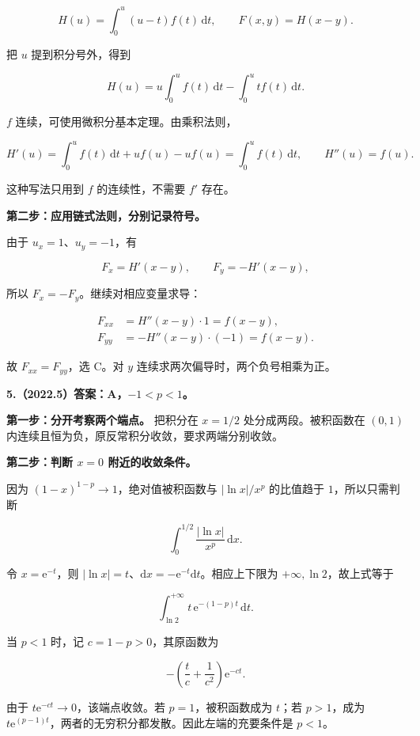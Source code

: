 \documentclass[UTF8,11pt,fontset=windows]{ctexart}
\begin{document}
$$
H(u)=\int_0^u(u-t)f(t)\,\mathrm dt,
\qquad F(x,y)=H(x-y).
$$

把 $u$ 提到积分号外，得到

$$
H(u)=u\int_0^u f(t)\,\mathrm dt-\int_0^u t f(t)\,\mathrm dt.
$$

$f$ 连续，可使用微积分基本定理。由乘积法则，

$$
H'(u)=\int_0^u f(t)\,\mathrm dt+uf(u)-uf(u)
=\int_0^u f(t)\,\mathrm dt,
\qquad H''(u)=f(u).
$$

这种写法只用到 $f$ 的连续性，不需要 $f'$ 存在。

\textbf{第二步：应用链式法则，分别记录符号。}

由于 $u_x=1$、$u_y=-1$，有

$$
F_x=H'(x-y),\qquad F_y=-H'(x-y),
$$

所以 $F_x=-F_y$。继续对相应变量求导：

$$
\begin{aligned}
F_{xx}&=H''(x-y)\cdot1=f(x-y),\\
F_{yy}&=-H''(x-y)\cdot(-1)=f(x-y).
\end{aligned}
$$

故 $F_{xx}=F_{yy}$，选 C。对 $y$ 连续求两次偏导时，两个负号相乘为正。

\clearpage

\textbf{5.（2022.5）答案：A，$-1<p<1$。}

\textbf{第一步：分开考察两个端点。} 把积分在 $x=1/2$ 处分成两段。被积函数在 $(0,1)$ 内连续且恒为负，原反常积分收敛，要求两端分别收敛。

\textbf{第二步：判断 $x=0$ 附近的收敛条件。}

因为 $(1-x)^{1-p}\to1$，绝对值被积函数与 $|\ln x|/x^p$ 的比值趋于 $1$，所以只需判断

$$
\int_0^{1/2}\frac{|\ln x|}{x^p}\,\mathrm dx.
$$

令 $x=\mathrm e^{-t}$，则 $|\ln x|=t$、$\mathrm dx=-\mathrm e^{-t}\mathrm dt$。相应上下限为 $+\infty,\ln2$，故上式等于

$$
\int_{\ln2}^{+\infty}t\,\mathrm e^{-(1-p)t}\,\mathrm dt.
$$

当 $p<1$ 时，记 $c=1-p>0$，其原函数为

$$
-\left(\frac tc+\frac1{c^2}\right)\mathrm e^{-ct}.
$$

由于 $t\mathrm e^{-ct}\to0$，该端点收敛。若 $p=1$，被积函数成为 $t$；若 $p>1$，成为 $t\mathrm e^{(p-1)t}$，两者的无穷积分都发散。因此左端的充要条件是 $p<1$。
\end{document}
